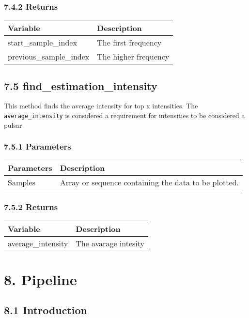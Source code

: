 \documentclass[]{article}
\begin{document}
\subsubsection{7.4.2 Returns}\label{returns-3}

\begin{longtable}[]{@{}ll@{}}
\toprule
Variable & Description\tabularnewline
\midrule
\endhead
start\_sample\_index & The first frequency\tabularnewline
previous\_sample\_index & The higher frequency\tabularnewline
\bottomrule
\end{longtable}

\subsection{7.5
find\_estimation\_intensity}\label{find_estimation_intensity}

This method finds the average intensity for top x intensities. The
\texttt{average\_intensity} is considered a requirement for intensities
to be considered a pulsar.

\subsubsection{7.5.1 Parameters}\label{parameters-7}

\begin{longtable}[]{@{}ll@{}}
\toprule
Parameters & Description\tabularnewline
\midrule
\endhead
Samples & Array or sequence containing the data to be
plotted.\tabularnewline
\bottomrule
\end{longtable}

\subsubsection{7.5.2 Returns}\label{returns-4}

\begin{longtable}[]{@{}ll@{}}
\toprule
Variable & Description\tabularnewline
\midrule
\endhead
average\_intensity & The avarage intesity\tabularnewline
\bottomrule
\end{longtable}

\section{8. Pipeline}\label{pipeline}

\subsection{8.1 Introduction}\label{introduction-1}
\end{document}
